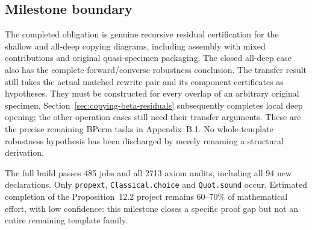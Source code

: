 
\subsection{Milestone boundary}
The completed obligation is genuine recursive residual certification for the
shallow and all-deep copying diagrams, including assembly with mixed
contributions and original quasi-specimen packaging. The closed all-deep case
also has the complete forward/converse robustness conclusion. The transfer
result still takes the actual matched rewrite pair and its component
certificates as hypotheses. They must be constructed for every overlap of
an arbitrary original specimen. Section~\ref{sec:copying-beta-residuals}
subsequently completes local deep opening; the other operation cases still
need their transfer arguments. These are the precise
remaining BPerm tasks in Appendix~B.1. No whole-template robustness hypothesis
has been discharged by merely renaming a structural derivation.

The full build passes 485 jobs and all 2713 axiom audits, including all 94 new
declarations. Only \texttt{propext}, \texttt{Classical.choice} and
\texttt{Quot.sound} occur. Estimated completion of the Proposition~12.2 project
remains 60--70\% of mathematical effort, with low confidence: this milestone
closes a specific proof gap but not an entire remaining template family.
